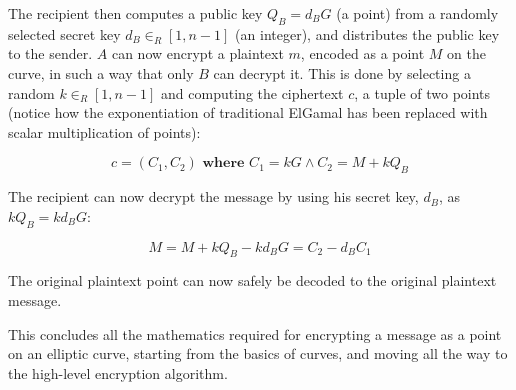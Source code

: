 The recipient then computes a public key \(Q_B = d_B G\) (a point) from a randomly selected secret key
\(d_B \in_R [1,n-1]\) (an integer), and distributes the public key to the sender. \(A\) can now encrypt
a plaintext \(m\), encoded as a point \(M\) on the curve, in such a way that only \(B\) can decrypt
it. This is done by selecting a random \(k \in_R [1,n-1]\) and computing the ciphertext \(c\), a
tuple of two points (notice how the exponentiation of traditional ElGamal has been replaced with scalar
multiplication of points):

\begin{equation}
	c = (C_1, C_2)  \textbf{ where }  C_1 = kG \land C_2 = M+kQ_B
\end{equation}

The recipient can now decrypt the message by using his secret key, \(d_B\), as \(kQ_B = kd_BG\):

\begin{equation}
	M = M + k Q_B - k d_B G = C_2 - d_B C_1
\end{equation}

The original plaintext point can now safely be decoded to the original plaintext message.\cite{hankerson2010}

This concludes all the mathematics required for encrypting a message as a point on an elliptic curve, starting from
the basics of curves, and moving all the way to the high-level encryption algorithm.
